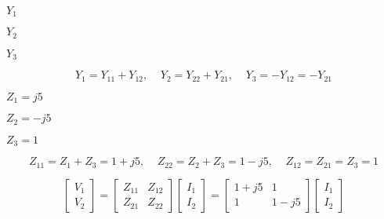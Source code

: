 {\newpage\clearpage
{}%
$Y_1$%
\lthtmlinlinemathZ
\lthtmlcheckvsize\clearpage}

{\newpage\clearpage
{}%
$Y_2$%
\lthtmlinlinemathZ
\lthtmlcheckvsize\clearpage}

{\newpage\clearpage
{}%
$Y_3$%
\lthtmlinlinemathZ
\lthtmlcheckvsize\clearpage}

{\newpage\clearpage
{}%
\begin{displaymath} Y_1=Y_{11}+Y_{12},\;\;\;\;Y_2=Y_{22}+Y_{21},\;\;\;\;Y_3=-Y_{12}=-Y_{21} \end{displaymath}%
\lthtmldisplayZ
\lthtmlcheckvsize\clearpage}

{\newpage\clearpage
{}%
$Z_1=j5$%
\lthtmlinlinemathZ
\lthtmlcheckvsize\clearpage}

{\newpage\clearpage
{}%
$Z_2=-j5$%
\lthtmlinlinemathZ
\lthtmlcheckvsize\clearpage}

{\newpage\clearpage
{}%
$Z_3=1$%
\lthtmlinlinemathZ
\lthtmlcheckvsize\clearpage}

{\newpage\clearpage
{}%
\begin{displaymath}  Z_{11}=Z_1+Z_3=1+j5,\;\;\;\;Z_{22}=Z_2+Z_3=1-j5,\;\;\;\;Z_{12}=Z_{21}=Z_3=1 \end{displaymath}%
\lthtmldisplayZ
\lthtmlcheckvsize\clearpage}

{\newpage\clearpage
{}%
\begin{displaymath}	\left[ \begin{array}{l} V_1 \\V_2\end{array} \right]=
	\left[ \begin{array}{cc} Z_{11} & Z_{12} \\Z_{21} & Z_{22} \end{array} \right]
	\left[ \begin{array}{l} I_1 \\I_2\end{array} \right]
=	\left[ \begin{array}{cc} 1+j5 & 1 \\1 & 1-j5 \end{array} \right]
	\left[ \begin{array}{l} I_1 \\I_2\end{array} \right]
\end{displaymath}%
\lthtmldisplayZ
\lthtmlcheckvsize\clearpage}

